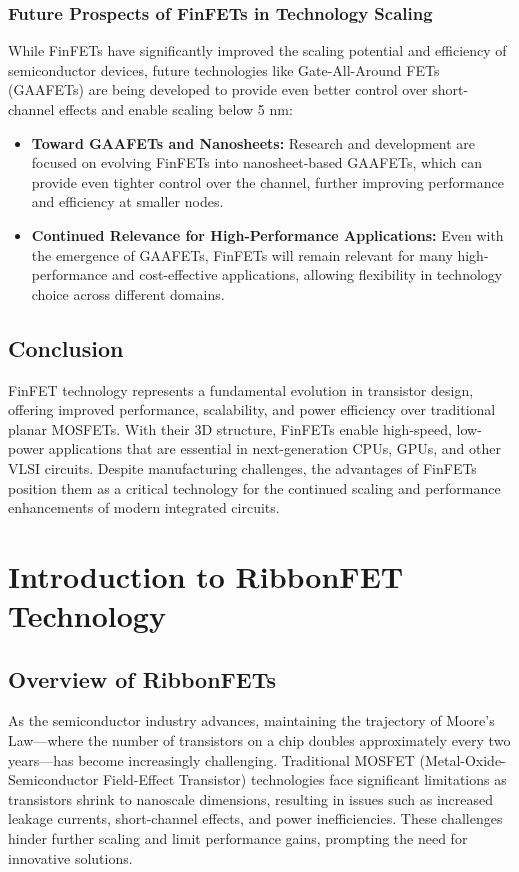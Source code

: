 \documentclass[12pt]{report}
\begin{document}
\begin{titlepage}
\subsection{Future Prospects of FinFETs in Technology Scaling}
While FinFETs have significantly improved the scaling potential and efficiency of semiconductor devices, future technologies like Gate-All-Around FETs (GAAFETs) are being developed to provide even better control over short-channel effects and enable scaling below 5 nm:
\begin{itemize}
    \item \textbf{Toward GAAFETs and Nanosheets:} Research and development are focused on evolving FinFETs into nanosheet-based GAAFETs, which can provide even tighter control over the channel, further improving performance and efficiency at smaller nodes.
    \item \textbf{Continued Relevance for High-Performance Applications:} Even with the emergence of GAAFETs, FinFETs will remain relevant for many high-performance and cost-effective applications, allowing flexibility in technology choice across different domains.
\end{itemize}






\section{Conclusion}
FinFET technology represents a fundamental evolution in transistor design, offering improved performance, scalability, and power efficiency over traditional planar MOSFETs. With their 3D structure, FinFETs enable high-speed, low-power applications that are essential in next-generation CPUs, GPUs, and other VLSI circuits. Despite manufacturing challenges, the advantages of FinFETs position them as a critical technology for the continued scaling and performance enhancements of modern integrated circuits.





\chapter{Introduction to RibbonFET Technology}
\section{Overview of RibbonFETs}


As the semiconductor industry advances, maintaining the trajectory of Moore's Law—where the number of transistors on a chip doubles approximately every two years—has become increasingly challenging. Traditional MOSFET (Metal-Oxide-Semiconductor Field-Effect Transistor) technologies face significant limitations as transistors shrink to nanoscale dimensions, resulting in issues such as increased leakage currents, short-channel effects, and power inefficiencies. These challenges hinder further scaling and limit performance gains, prompting the need for innovative solutions.


\end{titlepage}
\end{document}
